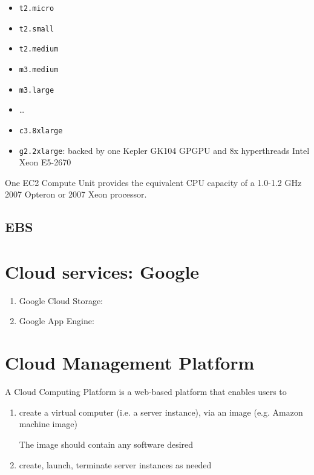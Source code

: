 \begin{itemize}
  \item \verb!t2.micro!
  \item \verb!t2.small!
  \item \verb!t2.medium!
  \item \verb!m3.medium!
  \item \verb!m3.large!
  \item \ldots
  \item \verb!c3.8xlarge! 
  \item \verb!g2.2xlarge!: backed by one Kepler GK104 GPGPU and 8x hyperthreads
  Intel Xeon E5-2670
\end{itemize}

One EC2 Compute Unit provides the equivalent CPU capacity of a 1.0-1.2 GHz 2007
Opteron or 2007 Xeon processor.


\subsection{EBS}

% 


\section{Cloud services: Google}

\begin{enumerate}
  \item Google Cloud Storage: 
  
  \item Google App Engine: 
\end{enumerate}


\section{Cloud Management Platform} 

A Cloud Computing Platform is a web-based platform that enables users to 
\begin{enumerate}
  \item create a virtual computer (i.e. a server instance), via an image (e.g.
  Amazon machine image)
  
  The image should contain any software desired
  
  \item create, launch, terminate server instances as needed
\end{enumerate}


